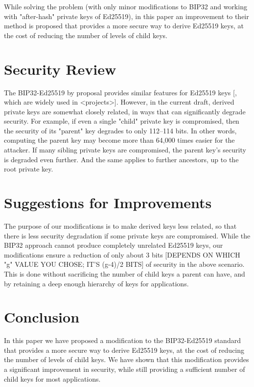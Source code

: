 \documentclass[12pt, a4paper, twocolumn]{article}
\begin{document}
While solving the problem (with only minor modifications to BIP32 and working with "after-hash" private keys of Ed25519), in this paper an improvement to their method is proposed that provides a more secure way to derive Ed25519 keys, at the cost of reducing the number of levels of child keys.


\section{Security Review}

The BIP32-Ed25519 by  proposal provides similar features for Ed25519 keys [, which are widely used in <projects>]. However, in the current draft, derived private keys are somewhat closely related, in ways that can significantly degrade security. For example, if even a single "child" private key is compromised, then the security of its "parent" key degrades to only 112--114 bits. In other words, computing the parent key may become more than 64,000 times easier for the attacker. If many sibling private keys are compromised, the parent key's security is degraded even further. And the same applies to further ancestors, up to the root private key.


\section{Suggestions for Improvements}

The purpose of our modifications is to make derived keys less related, so that there is less security degradation if some private keys are compromised. While the BIP32 approach cannot produce completely unrelated Ed25519 keys, our modifications ensure a reduction of only about 3 bits [DEPENDS ON WHICH "g" VALUE YOU CHOSE; IT'S (g-4)/2 BITS] of security in the above scenario. This is done without sacrificing the number of child keys a parent can have, and by retaining a deep enough hierarchy of keys for applications.

\section{Conclusion}

In this paper we have proposed a modification to the BIP32-Ed25519 standard that provides a more secure way to derive Ed25519 keys, at the cost of reducing the number of levels of child keys. We have shown that this modification provides a significant improvement in security, while still providing a sufficient number of child keys for most applications.

\lipsum[1]


\nocite{*}


\end{document}
